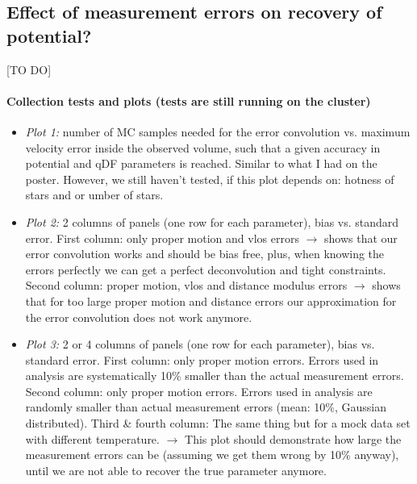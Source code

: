 \subsection{Effect of measurement errors on recovery of potential?} \label{sec:results_errors}

[TO DO]

\paragraph{Collection tests and plots (tests are still running on the cluster)}

\begin{itemize}
\item \emph{Plot 1:} number of MC samples needed for the error convolution vs. maximum velocity error inside the observed volume, such that a given accuracy in potential and qDF parameters is reached. Similar to what I had on the poster. However, we still haven't tested, if this plot depends on: hotness of stars and or umber of stars.

\item \emph{Plot 2:} 2 columns of panels (one row for each parameter), bias vs. standard error. First column: only proper motion and vlos errors $\longrightarrow$ shows that our error convolution works and should be bias free, plus, when knowing the errors perfectly we can get a perfect deconvolution and tight constraints. Second column: proper motion, vlos and distance modulus errors $\longrightarrow$ shows that for too large proper motion and distance errors our approximation for the error convolution does not work anymore.

\item \emph{Plot 3:} 2 or 4 columns of panels (one row for each parameter), bias vs. standard error. First column: only proper motion errors. Errors used in analysis are systematically 10\% smaller than the actual measurement errors. Second column: only proper motion errors. Errors used in analysis are randomly smaller than actual measurement errors (mean: 10\%, Gaussian distributed). Third \& fourth column: The same thing but for a mock data set with different temperature. $\longrightarrow$ This plot should demonstrate how large the measurement errors can be (assuming we get them wrong by 10\% anyway), until we are not able to recover the true parameter anymore.

\end{itemize}
